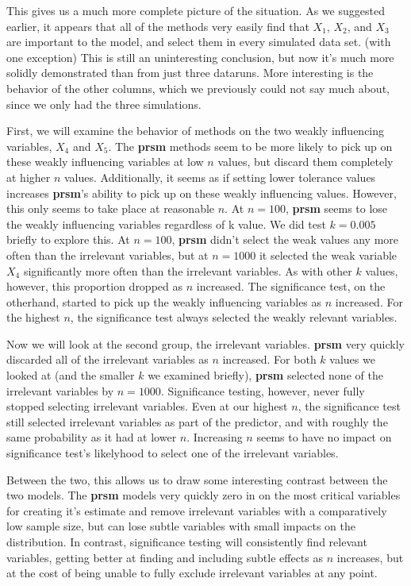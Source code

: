 \documentclass[letter]{article}
\begin{document}
This gives us a much more complete picture of the situation. As we suggested earlier, it appears that all of the methods very easily find that $X_1$, $X_2$, and $X_3$ are important to the model, and select them in every simulated data set. (with one exception) This is still an uninteresting conclusion, but now it's much more solidly demonstrated than from just three dataruns. More interesting is the behavior of the other columns, which we previously could not say much about, since we only had the three simulations.

First, we will examine the behavior of methods on the two weakly influencing variables, $X_4$ and $X_5$. The \textbf{prsm} methods seem to be more likely to pick up on these weakly influencing variables at low $n$ values, but discard them completely at higher $n$ values. Additionally, it seems as if setting lower tolerance values increases \textbf{prsm}'s ability to pick up on these weakly influencing values. However, this only seems to take place at reasonable $n$. At $n=100$, \textbf{prsm} seems to lose the weakly influencing variables regardless of k value. We did test $k=0.005$ briefly to explore this. At $n=100$, \textbf{prsm} didn't select the weak values any more often than the irrelevant variables, but at $n=1000$ it selected the weak variable $X_4$ significantly more often than the irrelevant variables. As with other $k$ values, however, this proportion dropped as $n$ increased. The significance test, on the otherhand, started to pick up the weakly influencing variables as $n$ increased. For the highest $n$, the significance test always selected the weakly relevant variables. 

Now we will look at the second group, the irrelevant variables. \textbf{prsm} very quickly discarded all of the irrelevant variables as $n$ increased. For both $k$ values we looked at (and the smaller $k$ we examined briefly), \textbf{prsm} selected none of the irrelevant variables by $n=1000$. Significance testing, however, never fully stopped selecting irrelevant variables. Even at our highest $n$, the significance test still selected irrelevant variables as part of the predictor, and with roughly the same probability as it had at lower $n$. Increasing $n$ seems to have no impact on significance test's likelyhood to select one of the irrelevant variables.

Between the two, this allows us to draw some interesting contrast between the two models. The \textbf{prsm} models very quickly zero in on the most critical variables for creating it's estimate and remove irrelevant variables with a comparatively low sample size, but can lose subtle variables with small impacts on the distribution. In contrast, significance testing will consistently find relevant variables, getting better at finding and including subtle effects as $n$ increases, but at the cost of being unable to fully exclude irrelevant variables at any point.
\end{document}
